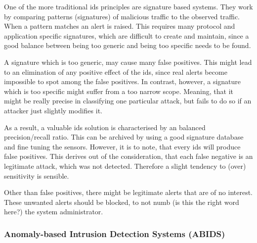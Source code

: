 One of the more traditional \gls{ids} principles are signature based systems.
They work by comparing patterns (signatures) of malicious traffic to the observed traffic. When a pattern matches an alert is raised.
This requires many protocol and application specific signatures, which are difficult to create and maintain, since a good balance between being too generic and being too specific needs to be found.

A signature which is too generic, may cause many false positives. This might lead to an elimination of any positive effect of the \gls{ids}, since real alerts become impossible to spot among the false positives.
In contrast, however, a signature which is too specific might suffer from a too narrow scope. Meaning, that it might be really precise in classifying one particular attack, but fails to do so if an attacker just slightly modifies it.

As a result, a valuable \gls{ids} solution is characterised by an balanced precision/recall ratio. This can be archived by using a good signature database and fine tuning the sensors.
However, it is to note, that every \gls{ids} will produce false positives. This derives out of the consideration, that each false negative is an legitimate attack, which was not detected. Therefore a slight tendency to (over) sensitivity is sensible.

Other than false positives, there might be legitimate alerts that are of no interest. These unwanted alerts should be blocked, to not numb \alert{(is this the right word here?)} the system administrator. \parencite[cf.][pp.~205-206]{Northcutt2005}
	
\subsubsection{Anomaly-based Intrusion Detection Systems (ABIDS)}
\label{sec:background:network:ids:anomaly}
	
